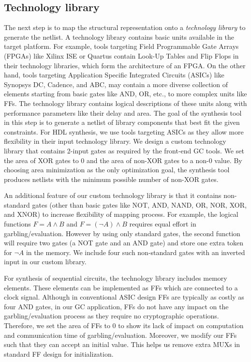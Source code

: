\subsection{Technology library}
The next step is to map the structural representation onto a \emph{technology library} to generate the netlist.
A technology library contains basic units available in the target platform.
For example, tools targeting Field Programmable Gate Arrays (FPGAs) like Xilinx ISE or Quartus contain Look-Up Tables and Flip Flops in their technology libraries, which form the architecture of an FPGA.
On the other hand, tools targeting Application Specific Integrated Circuits (ASICs) like Synopsys DC, Cadence, and ABC, may contain a more diverse collection of elements starting from basic gates like AND, OR, etc., to more complex units like FFs.
The technology library contains logical descriptions of these units along with performance parameters like their delay and area.
The goal of the synthesis tool in this step is to generate a netlist of library components that best fit the given constraints.
For HDL synthesis, we use tools targeting ASICs as they allow more flexibility in their input technology library.
We design a custom technology library that contains 2-input gates as required by the front-end GC tools.
We set the area of XOR gates to 0 and the area of non-XOR gates to a non-0 value.
By choosing area minimization as the only optimization goal, the synthesis tool produces netlists with the minimum possible number of non-XOR gates.

An additional feature of our custom technology library is that it contains non-standard gates (other than basic gates like NOT, AND, NAND, OR, NOR, XOR, and XNOR) to increase flexibility of mapping process.
For example, the logical functions $F = A\wedge B$ and $F = (\neg A)\wedge B$ requires equal effort in garbling/evaluation.
However by using only standard gates, the second function will require two gates (a NOT gate and an AND gate) and store one extra token for $\neg A$ in the memory.
We include four such non-standard gates with an inverted input in our custom library.

For synthesis of sequential circuits, the technology library includes memory elements.
These elements can be implemented as FFs which are connected to a clock signal.
Although in conventional ASIC design FFs are typically as costly as four AND gates, in our GC application, FFs do not have any impact on the garbling/evaluation process as they require no cryptographic operations.
Therefore, we set the area of FFs to 0 to show its lack of impact on computation and communication time of garbling/evaluation.
Moreover, we modify our FFs such that they can accept an initial value.
This helps us remove extra MUXs in standard FF design for initialization.

